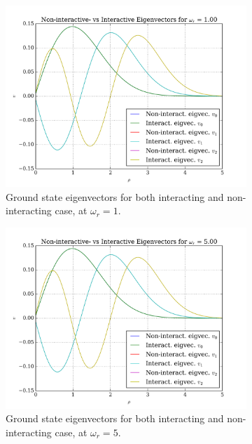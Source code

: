 \documentclass[11pt,a4paper,notitlepage]{article}
\begin{document}
\begin{figure}[H]
	\begin{subfigure}[b]{0.45\textwidth}
 		\includegraphics[scale=0.40]{../interacting_eigvecs_at_omega=1000.png}
 		\caption{Ground state eigenvectors for both interacting and non-interacting case, at $\omega_r = 1$.}\label{fig:eigvecs-interact1000}
 	\end{subfigure}
 	\hfill
 	\begin{subfigure}[b]{0.45\textwidth}
 		\includegraphics[scale=0.40]{../interacting_eigvecs_at_omega=5000.png}
 		\caption{Ground state eigenvectors for both interacting and non-interacting case, at $\omega_r = 5$.}\label{fig:eigvecs-interact5000}
 	\end{subfigure}
 	\begin{subfigure}[t]{0.45\textwidth}

\end{subfigure}
\end{figure}
\end{document}
